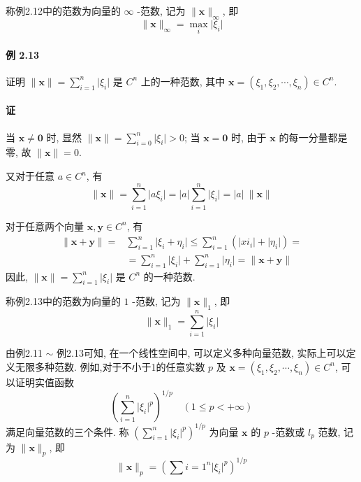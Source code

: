 \par 称例2.12中的范数为向量的 $\infty $ -范数, 记为 $\lVert \bm{x} \rVert _{\infty}$, 即
\begin{equation}
    \lVert \bm{x} \rVert _\infty = \mathop{\max}_{i} \lvert \xi_i \rvert
    \tag{2.2.2}
\end{equation}

\paragraph*{例 2.13} 证明 $\lVert \bm{x} \rVert = \sum\limits_{i = 1}^n \lvert \xi_i \rvert$ 是 $C^n$ 上的一种范数, 其中 $\bm{x} = (\xi_1, \xi_2, \cdots, \xi_n) \in C^n$.

\paragraph*{证} 当 $\bm{x} \neq \bm{0}$ 时, 显然 $\lVert \bm{x} \rVert = \sum\limits_{i=0}^n \lvert \xi_i \rvert > 0$; 当 $\bm{x} = \bm{0}$ 时, 由于 $\bm{x}$ 的每一分量都是零, 故 $\lVert \bm{x} \rVert = 0$.
\par 又对于任意 $a \in C^n$, 有
$$
    \lVert \bm{x} \rVert = \sum_{i = 1}^n \lvert a\xi_i \rvert = \lvert a \rvert \sum\limits_{i=1}^n \lvert \xi_i \rvert = \lvert a \rvert \ \lVert \bm{x} \rVert
$$
\par 对于任意两个向量 $\bm{x}, \bm{y} \in C^n$, 有
\begin{align*}
    \lVert \bm{x} + \bm{y} \rVert = & \sum\limits_{i = 1}^n \lvert \xi_i + \eta_i \rvert \leqslant \sum\limits_{i=1}^n(\lvert xi_i \rvert + \lvert \eta_i \rvert) = \\
                                    & = \sum\limits_{i=1}^n \lvert \xi_i \rvert +  \sum\limits_{i=1}^n \lvert \eta_i \rvert = \lVert \bm{x} + \bm{y} \rVert
\end{align*}
因此, $\lVert \bm{x} \rVert = \sum\limits_{i=1}^n \lvert \xi_i \rvert$ 是 $C^n$ 的一种范数.

\par 称例2.13中的范数为向量的 $1$ -范数, 记为 $\lVert \bm{x} \rVert _1$, 即
\begin{equation}
    \lVert \bm{x} \rVert _1 = \sum_{i=1}^{n} \lvert \xi_i \rvert
    \tag{2.2.3}
\end{equation}

\par 由例2.11 $\sim$ 例2.13可知, 在一个线性空间中, 可以定义多种向量范数, 实际上可以定义无限多种范数. 例如,对于不小于1的任意实数 $p$ 及 $\bm{x} = (\xi_1, \xi_2, \cdots, \xi_n) \in C^n$, 可以证明实值函数
$$
    (\sum\limits_{i=1}^n \lvert \xi_i \rvert^p)^{1/p} \quad (1 \leqslant p < +\infty)
$$
满足向量范数的三个条件. 称 $(\sum\limits_{i=1}^n \lvert \xi_i \rvert^p)^{1/p}$ 为向量 $\bm{x}$ 的 $p$ -范数或 $l_p$ 范数, 记为 $\lVert \bm{x} \rVert _p$, 即
\begin{equation}
    \lVert \bm{x} \rVert _p = (\sum{i=1}^n \lvert \xi_i \rvert^p)^{1/p}
    \tag{2.2.4}
\end{equation}

